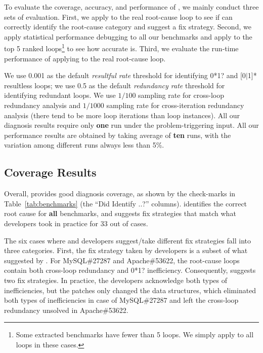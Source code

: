 %

To evaluate the coverage, accuracy, and performance of \Tool, we mainly conduct
three sets of evaluation. First, we apply \Tool to the real root-cause loop to
see if \Tool can correctly identify the root-cause category and suggest
a fix strategy. Second, we apply
statistical performance debugging \cite{SongOOPSLA2014} to all our benchmarks
and apply \Tool to the top 5 ranked loops\footnote{Some extracted benchmarks
have fewer than 5 loops. We simply apply \Tool to all loops in these cases.}
to see how accurate \Tool is. Third, we evaluate the run-time performance of
applying \Tool to the real root-cause loop. 
 

We use 0.001 as the default \textit{resultful rate} threshold for identifying
0*1? 
and [0$|$1]* resultless loops; we use 
0.5 as the default \textit{redundancy rate} threshold for identifying redundant loops.
We use $1/100$ sampling rate for cross-loop redundancy analysis and 
$1/1000$ sampling rate for cross-iteration redundancy analysis
(there tend to be more loop iterations than loop instances).
All our diagnosis results require only \textbf{one} run under the 
problem-triggering input.
All our performance results are obtained by taking average of \textbf{ten} runs, 
with the variation among different runs always less than 5\%.


\subsection{Coverage Results}
\label{sec:coverage}
Overall, \Tool provides good diagnosis coverage, as shown by the check-marks in Table~\ref{tab:benchmarks}
(the ``Did \Tool Identify ..?'' columns). 
\Tool identifies the correct root cause for \textbf{all} \allbugs benchmarks, and 
suggests fix strategies that match what developers took in practice
for 33 out of \allbugs cases. 

The six cases where \Tool and developers suggest/take different fix strategies
fall into three categories.
First, the fix strategy taken by developers is a subset of what suggested by 
\Tool.
For MySQL\#27287 and Apache\#53622, the root-cause loops contain both
cross-loop redundancy and 0*1? inefficiency. Consequently, \Tool suggests two
fix strategies. In practice, the developers
acknowledge both types of inefficiencies, but the patches
only changed the data structures, which eliminated both types of inefficiencies 
in case of MySQL\#27287 and left the cross-loop redundancy unsolved in
Apache\#53622. 

